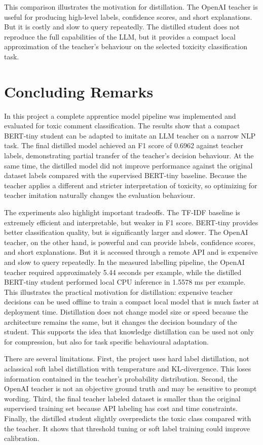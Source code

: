 \documentclass[pdflatex,sn-mathphys-num]{sn-jnl}
\begin{document}
This comparison illustrates the motivation for distillation.
The OpenAI teacher is useful for producing high-level labels, confidence scores, and short explanations.
But it is costly and slow to query repeatedly.
The distilled student does not reproduce the full capabilities of the LLM, but it provides a compact local approximation of the teacher's behaviour on the selected toxicity classification task.

\section{Concluding Remarks}\label{sec:conclusion}

In this project a complete apprentice model pipeline was implemented and evaluated for toxic comment classification.
The results show that a compact BERT-tiny student can be adapted to imitate an LLM teacher on a narrow NLP task.
The final distilled model achieved an F1 score of 0.6962 against teacher labels, demonstrating partial transfer of the teacher's decision behaviour.
At the same time, the distilled model did not improve performance against the original dataset labels compared with the supervised BERT-tiny baseline.
Because the teacher applies a different and stricter interpretation of toxicity, so optimizing for teacher imitation naturally changes the evaluation behaviour.

The experiments also highlight important tradeoffs.
The TF-IDF baseline is extremely efficient and interpretable, but weaker in F1 score.
BERT-tiny provides better classification quality, but is significantly larger and slower.
The OpenAI teacher, on the other hand, is powerful and can provide labels, confidence scores, and short explanations.
But it is accessed through a remote API and is expensive and slow to query repeatedly.
In the measured labelling pipeline, the OpenAI teacher required approximately 5.44 seconds per example, while the distilled BERT-tiny student performed local CPU inference in 1.5578 ms per example.
This illustrates the practical motivation for distillation: expensive teacher decisions can be used offline to train a compact local model that is much faster at deployment time.
Distillation does not change model size or speed because the architecture remains the same, but it changes the decision boundary of the student.
This supports the idea that knowledge distillation can be used not only for compression, but also for task specific behavioural adaptation.

There are several limitations.
First, the project uses hard label distillation, not aclassical soft label distillation with temperature and KL-divergence.
This loses information contained in the teacher's probability distribution.
Second, the OpenAI teacher is not an objective ground truth and may be sensitive to prompt wording.
Third, the final teacher labeled dataset is smaller than the original supervised training set because API labeling has cost and time constraints.
Finally, the distilled student slightly overpredicts the toxic class compared with the teacher.
It shows that threshold tuning or soft label training could improve calibration.
\end{document}
